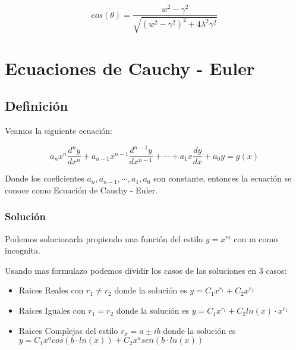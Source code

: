 \documentclass[12pt]{report}                               %
\begin{document}
        \begin{equation*}
            cos(\theta) = \frac{w^2 - \gamma^2}{\sqrt{(w^2-\gamma^2)^2 +4\lambda^2\gamma^2 }}
        \end{equation*}


\chapter{Ecuaciones de Cauchy - Euler}
    \clearpage

    \section{Definición}

        Veamos la siguiente ecuación:

        \begin{equation}
            a_n x^n \frac{d^n y}{dx^n} + a_{n-1} x^{n-1} \frac{d^{n-1} y}{dx^{n-1}} + \cdots + a_1 x \frac{dy}{dx} + a_0 y = g(x)
        \end{equation}

        Donde los coeficientes $a_n, a_{n-1}, \cdots , a_1, a_0$ son constante, entonces la ecuación se conoce como Ecuación de Cauchy - Euler.

        \subsection{Solución}
        Podemos solucionarla propiendo una función del estilo $y = x^m$ con m como incognita.

        Usando mas formulazo podemos dividir los casos de las soluciones en 3 casos:

        \begin{itemize}
            \item Raices Reales con $r_1 \neq r_2$ donde la solución es $ y = C_1 x ^{r_1} + C_2 x^{r_2}$ 
            \item Raices Iguales con $r_1 = r_2$ donde la solución es $ y = C_1 x ^{r_1} + C_2 ln(x) \cdot x^{r_1}$ 
            \item Raices Complejas del estilo $r_x  = a \pm ib$ donde la solución es \\
            $ y = C_1 x^a cos(b \cdot ln(x)) + C_2 x^a sen(b \cdot ln(x))$ 
        \end{itemize}
\end{document}

